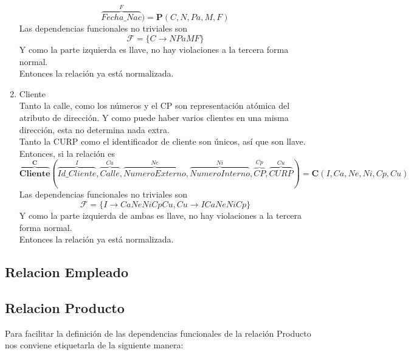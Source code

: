 \documentclass[10pt]{article}
\begin{document}
\begin{enumerate}
\[	   \overbrace{Fecha\_Nac}^{F}
	)
	= 
	\textbf{P}(C, N, Pa, M, F)
	\]
	Las dependencias funcionales no triviales son 
	\[\mathcal{F} = \{C \rightarrow NPaMF\}\]
	Y como la parte izquierda es llave,  no hay violaciones a la tercera forma
	normal.\\
	Entonces la relación ya está normalizada.
	\item Cliente \\
	Tanto la calle, como los números y el CP son representación atómica del
	atributo de dirección. Y como puede haber varios clientes en una misma
	dirección, esta no determina nada extra.\\
	Tanto la CURP como el identificador de cliente son únicos, así que son
	llave.\\
	Entonces, si la relación es 
	\[\overbrace{{\textbf{Cliente}}}^{\textbf{C}} 
   (
	   \overbrace{Id\_Cliente}^{I}, \overbrace{Calle}^{Ca}, 
	   \overbrace{Numero Externo}^{Ne}, \overbrace{Numero Interno}^{Ni},
	   \overbrace{CP}^{Cp}, \overbrace{CURP}^{Cu}
	)
	= 
	\textbf{C}(I, Ca, Ne, Ni, Cp, Cu)
	\]
	Las dependencias funcionales no triviales son 
	\[\mathcal{F} = \{I \rightarrow CaNeNiCpCu, Cu \rightarrow ICaNeNiCp\}\]
	Y como la parte izquierda de ambas es llave, no hay violaciones a la tercera
	forma normal.\\
	Entonces la relación ya está normalizada.
\end{enumerate}

\subsection{Relacion Empleado}

\subsection{Relacion Producto}




Para facilitar la definición de las dependencias funcionales de la relación Producto nos conviene etiquetarla de la siguiente manera:
\end{document}
